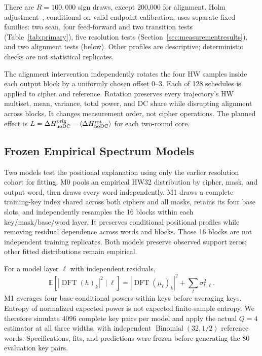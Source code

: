 \documentclass[electronics,article,submit,pdftex,oneauthor]{Definitions/mdpi}
\begin{document}
There are $R=100{,}000$ sign draws, except 200,000 for alignment. Holm adjustment~\citep{holm1979}, conditional on valid endpoint calibration, uses separate fixed families: two scan, four feed-forward and two transition tests (Table~\ref{tab:primary}), five resolution tests (Section~\ref{sec:measurementresults}), and two alignment tests (below). Other profiles are descriptive; deterministic checks are not statistical replicates.

The alignment intervention independently rotates the four HW samples inside each output block by a uniformly chosen offset 0--3. Each of 128 schedules is applied to cipher and reference. Rotation preserves every trajectory's HW multiset, mean, variance, total power, and DC share while disrupting alignment across blocks. It changes measurement order, not cipher operations. The planned effect is $L=\Delta H_{\rm noDC}^{\rm orig}-\langle\Delta H_{\rm noDC}^{\rm rot}\rangle$ for each two-round core.

\subsection{Frozen Empirical Spectrum Models}\label{sec:models}

Two models test the positional explanation using only the earlier resolution cohort for fitting. M0 pools an empirical HW32 distribution by cipher, mask, and output word, then draws every word independently. M1 draws a complete training-key index shared across both ciphers and all masks, retains its four base slots, and independently resamples the 16 blocks within each key/mask/base/word layer. It preserves conditional positional profiles while removing residual dependence across words and blocks. Those 16 blocks are not independent training replicates. Both models preserve observed support zeros; other fitted distributions remain empirical.

For a model layer $\ell$ with independent residuals,
\begin{equation}
 \mathbb E\!\left[|\operatorname{DFT}(h)_k|^2\mid\ell\right]
 =|\operatorname{DFT}(\mu_\ell)_k|^2+\sum_t\sigma_{t,\ell}^2.
 \label{eq:predictedpower}
\end{equation}
M1 averages four base-conditional powers within keys before averaging keys. Entropy of normalized expected power is not expected finite-sample entropy. We therefore simulate 4096 complete key pairs per model and apply the actual $Q=4$ estimator at all three widths, with independent $\operatorname{Binomial}(32,1/2)$ reference words. Specifications, fits, and predictions were frozen before generating the 80 evaluation key pairs.
\end{document}
